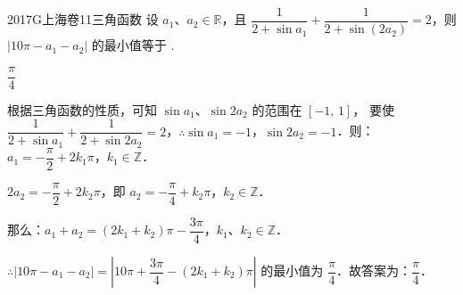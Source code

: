 
\begin{problem}{2017}{G}{上海卷}{11}{三角函数}
设 $ a_1 $、$ a_2 \in \mathbb{R} $，且 $ \dfrac{1}{2+\sin a_1} + \dfrac{1}{2+\sin(2a_2)} = 2 $，则 $ |10\pi - a_1 - a_2| $ 的最小值等于 \underline{\hspace{4em}}.
\end{problem}

\begin{answer}
$ \dfrac{\pi}{4} $
\end{answer}

\begin{solutions}
根据三角函数的性质，可知 $ \sin a_1 $、$ \sin 2a_2 $ 的范围在 $ [-1,\,1] $，  
要使 $ \dfrac{1}{2+\sin a_1} + \dfrac{1}{2+\sin 2a_2} = 2 $，$ \therefore \sin a_1 = -1 $，$ \sin 2a_2 = -1 $．则：$ a_1 = -\dfrac{\pi}{2} + 2k_1\pi $，$ k_1 \in \mathbb{Z} $．  

$ 2a_2 = -\dfrac{\pi}{2} + 2k_2\pi $，即 $ a_2 = -\dfrac{\pi}{4} + k_2\pi $，$ k_2 \in \mathbb{Z} $．  

那么：$ a_1 + a_2 = (2k_1 + k_2)\pi - \dfrac{3\pi}{4} $，$ k_1 $、$ k_2 \in \mathbb{Z} $．  

$ \therefore |10\pi - a_1 - a_2| = \left|10\pi + \dfrac{3\pi}{4} - (2k_1 + k_2)\pi\right| $ 的最小值为 $ \dfrac{\pi}{4} $．故答案为：$ \dfrac{\pi}{4} $．
\end{solutions}